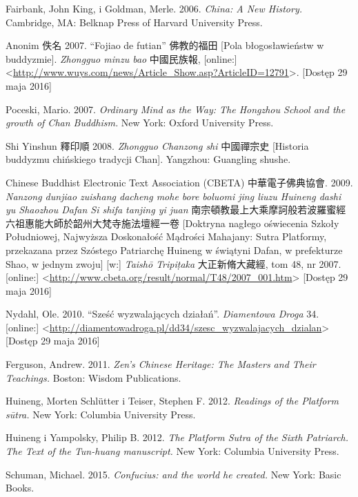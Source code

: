 Fairbank, John King, i Goldman, Merle. 2006. \textit{China: A New History.} Cambridge, MA: Belknap Press of Harvard University Press.

Anonim 佚名 2007. ``Fojiao de futian'' 佛教的福田 [Pola błogosławieństw w buddyzmie]. \textit{Zhongguo minzu bao} 中國民族報, [online:] <\url{http://www.wuys.com/news/Article_Show.asp?ArticleID=12791}>. [Dostęp 29 maja 2016]

Poceski, Mario. 2007. \textit{Ordinary Mind as the Way: The Hongzhou School and the growth of Chan Buddhism.} New York: Oxford University Press.

Shi Yinshun 釋印順 2008. \textit{Zhongguo Chanzong shi} 中國禪宗史 [Historia buddyzmu chińskiego tradycji Chan]. Yangzhou: Guangling shushe.

Chinese Buddhist Electronic Text Association (CBETA) 中華電子佛典協會. 2009. \textit{Nanzong dunjiao zuishang dacheng mohe bore boluomi jing liuzu Huineng dashi yu Shaozhou Dafan Si shifa tanjing yi juan} 南宗頓教最上大乘摩訶般若波羅蜜經六祖惠能大師於韶州大梵寺施法壇經一卷 [Doktryna nagłego oświecenia Szkoły Południowej, Najwyższa Doskonałość Mądrości Mahajany: Sutra Platformy, przekazana przez Szóstego Patriarchę Huineng w świątyni Dafan, w prefekturze Shao, w jednym zwoju] [w:] \textit{Taishō Tripi\d{t}aka} 大正新脩大藏經, tom 48, nr 2007. [online:] <\url{http://www.cbeta.org/result/normal/T48/2007_001.htm}> [Dostęp 29 maja 2016]

Nydahl, Ole. 2010. ``Sześć wyzwalających działań''. \textit{Diamentowa Droga} 34. [online:] <\url{http://diamentowadroga.pl/dd34/szesc_wyzwalajacych_dzialan}> [Dostęp 29 maja 2016]

Ferguson, Andrew. 2011. \textit{Zen's Chinese Heritage: The Masters and Their Teachings.} Boston: Wisdom Publications.

Huineng, Morten Schlütter i Teiser, Stephen F. 2012. \textit{Readings of the Platform sūtra.} New York: Columbia University Press.

Huineng i Yampolsky, Philip B. 2012. \textit{The Platform Sutra of the Sixth Patriarch. The Text of the Tun-huang manuscript.} New York: Columbia University Press.

Schuman, Michael. 2015. \textit{Confucius: and the world he created.} New York: Basic Books.
